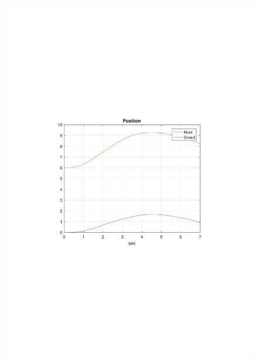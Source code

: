 \begin{frame}[c]
\begin{columns}[T]
\begin{figure}
			\includegraphics[trim=4cm 9cm 4cm 9.5cm, clip=true, width=\linewidth]{img/Position}
		\end{figure}
	\end{columns}
\end{frame}

